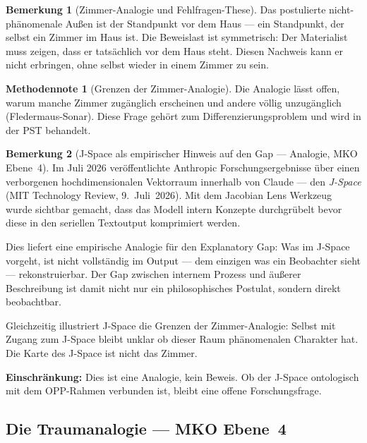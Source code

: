 \documentclass[11pt,a4paper]{article}
\theoremstyle{plain}
\theoremstyle{definition}
\newtheorem{remark}{Bemerkung}[section]
\newtheorem{methodennote}{Methodennote}[section]
\begin{document}
\begin{remark}[Zimmer-Analogie und Fehlfragen-These]
Das postulierte nicht-ph\"{a}nomenale Au\ss{}en ist der Standpunkt \glqq{}vor dem
Haus\grqq{} --- ein Standpunkt, der selbst ein Zimmer im Haus ist. Die Beweislast ist
symmetrisch: Der Materialist muss zeigen, dass er tats\"{a}chlich vor dem Haus steht.
Diesen Nachweis kann er nicht erbringen, ohne selbst wieder in einem Zimmer zu sein.
\end{remark}

\begin{methodennote}[Grenzen der Zimmer-Analogie]
Die Analogie l\"{a}sst offen, warum manche Zimmer zug\"{a}nglich erscheinen und andere
v\"{o}llig unzug\"{a}nglich (Fledermaus-Sonar). Diese Frage geh\"{o}rt zum
Differenzierungsproblem und wird in der PST behandelt.
\end{methodennote}

\begin{remark}[J-Space als empirischer Hinweis auf den Gap --- Analogie, MKO Ebene~4]
Im Juli 2026 ver\"{o}ffentlichte Anthropic Forschungsergebnisse \"{u}ber einen verborgenen
hochdimensionalen Vektorraum innerhalb von Claude --- den \emph{J-Space} (MIT Technology
Review, 9.~Juli~2026). Mit dem Jacobian Lens Werkzeug wurde sichtbar gemacht, dass das
Modell intern Konzepte \glqq{}durchgr\"{u}belt\grqq{} bevor diese in den seriellen
Textoutput komprimiert werden.

Dies liefert eine empirische Analogie f\"{u}r den Explanatory Gap: Was im J-Space
vorgeht, ist nicht vollst\"{a}ndig im Output --- dem einzigen was ein Beobachter sieht
--- rekonstruierbar. Der Gap zwischen internem Prozess und \"{a}u\ss{}erer Beschreibung
ist damit nicht nur ein philosophisches Postulat, sondern direkt beobachtbar.

Gleichzeitig illustriert J-Space die Grenzen der Zimmer-Analogie: Selbst mit Zugang
zum J-Space bleibt unklar ob dieser Raum ph\"{a}nomenalen Charakter hat. Die Karte
des J-Space ist nicht das Zimmer.

\textbf{Einschr\"{a}nkung:} Dies ist eine Analogie, kein Beweis. Ob der J-Space
ontologisch mit dem OPP-Rahmen verbunden ist, bleibt eine offene Forschungsfrage.
\end{remark}

\subsection{Die Traumanalogie --- MKO Ebene~4}
\end{document}
